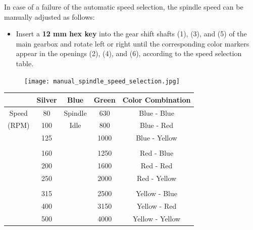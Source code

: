 \setcounter{section}{3}
\setcounter{page}{2}

In case of a failure of the automatic speed selection, the spindle speed can be manually adjusted as follows:

\begin{itemize}
    \item Insert a \textbf{12 mm hex key} into the gear shift shafts (1), (3), and (5) of the main gearbox and rotate left or right until the corresponding color markers appear in the openings (2), (4), and (6), according to the speed selection table.
\end{itemize}

\begin{figure}[h]
    \centering
    \texttt{[image: manual\_spindle\_speed\_selection.jpg]}
    \label{fig:manual_spindle_speed_selection}
\end{figure}

\begin{table}[h]
    \centering
    \renewcommand{\arraystretch}{1.3}
    \begin{tabular}{|c|c|c|c|c|}
        \hline \hline
        \textbf{} & \textbf{Silver} & \textbf{Blue} & \textbf{Green} & \textbf{Color Combination} \\
        \hline \hline
        Speed   & 80    &   Spindle & 630  & Blue - Blue  \\
        (RPM)   & 100   &   Idle    & 800  & Blue - Red   \\
                & 125   &           & 1000 & Blue - Yellow \\
                &       &           &       &               \\
                & 160   &           & 1250 & Red - Blue  \\
                & 200   &           & 1600 & Red - Red   \\
                & 250   &           & 2000 & Red - Yellow \\
                &       &           &       &               \\
                & 315   &           & 2500 & Yellow - Blue \\
                & 400   &           & 3150 & Yellow - Red  \\
                & 500   &           & 4000 & Yellow - Yellow \\
        \hline \hline
    \end{tabular}
    \label{tab:spindle_speed}
\end{table}

